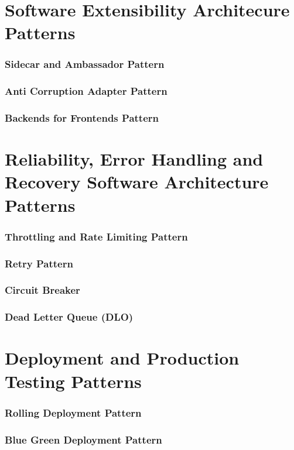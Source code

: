 \documentclass[a4paper, 11pt]{book}
\begin{document}
    \section{Software Extensibility Architecure Patterns}

    \subsubsection{Sidecar and Ambassador Pattern}
    \subsubsection{Anti Corruption Adapter Pattern}
    \subsubsection{Backends for Frontends Pattern}

    \section{Reliability, Error Handling and Recovery Software Architecture Patterns}

    \subsubsection{Throttling and Rate Limiting Pattern}
    \subsubsection{Retry Pattern}
    \subsubsection{Circuit Breaker}
    \subsubsection{Dead Letter Queue (DLO)}


    \section{Deployment and Production Testing Patterns}

    \subsubsection{Rolling Deployment Pattern}
    \subsubsection{Blue Green Deployment Pattern}
\end{document}
